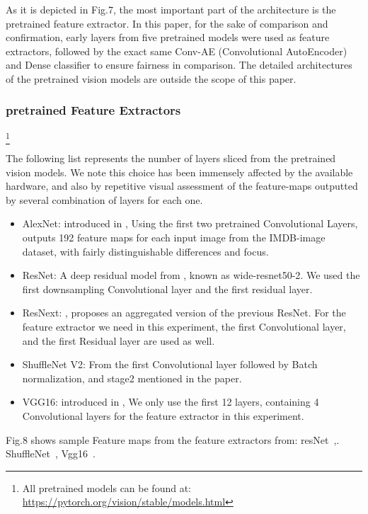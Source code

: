 \documentclass[conference]{IEEEtran}
\begin{document}
				As it is depicted in Fig.7, the most important part of the 
				architecture is the pretrained feature extractor. In this paper, for 
				the sake of comparison and confirmation, early layers from five 
				pretrained models were used as feature extractors, followed by the 
				exact same Conv-AE (Convolutional AutoEncoder) and Dense classifier to ensure fairness in comparison.
				The detailed architectures of the pretrained vision models are outside the scope of this paper.
		
\subsubsection{pretrained Feature Extractors}\footnote{All pretrained models can be found at: \url{https://pytorch.org/vision/stable/models.html}}

The following list represents the number of layers sliced from the pretrained vision models. We note this choice has been immensely affected by the available hardware, and also by repetitive visual assessment of the feature-maps outputted by several combination of layers for each one.
\begin{itemize}
			 \item{AlexNet: introduced in \cite{alexnet}, Using the first two pretrained Convolutional Layers, outputs
						192 feature maps for each input image from the IMDB-image dataset, 
						with fairly distinguishable differences and focus.}

			 \item  ResNet: A deep residual model from \cite{resnet}, known as wide-resnet50-2. We used the first downsampling Convolutional layer and the first residual layer.

			 \item  ResNext: \cite{resnext},
						proposes an aggregated version of the previous ResNet. For
						the feature extractor we need in this experiment, the first Convolutional layer,
						and the first Residual layer are used as well.

			 \item ShuffleNet V2: From \cite{shufflenetv2} 
							the first Convolutional layer followed by Batch normalization,
							and stage2 mentioned in the paper. 

			 \item VGG16: introduced in \cite{vgg16},
					We only use the first 12 layers, containing 4 Convolutional layers for the feature extractor in this experiment.
			 
\end{itemize}
Fig.8 shows sample Feature maps from the feature extractors from:
				resNet~\cite{resnet},. ShuffleNet~\cite{shufflenetv2}, Vgg16~\cite{vgg16}.
				
\end{document}
